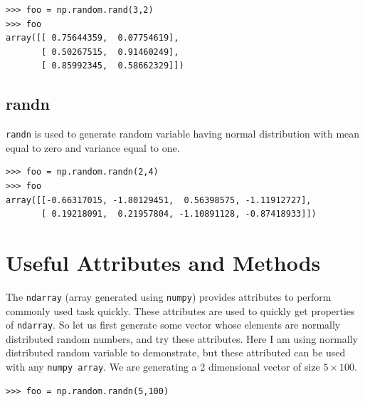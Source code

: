 \documentclass[10pt]{book}
\begin{document}
{\beforeverb \begin{verbatim}
>>> foo = np.random.rand(3,2)
>>> foo
array([[ 0.75644359,  0.07754619],
       [ 0.50267515,  0.91460249],
       [ 0.85992345,  0.58662329]])
\end{verbatim} \afterverb

\subsection{randn}
\verb"randn" is used to generate random variable having normal distribution with mean equal to zero and variance equal to one.

\beforeverb
\begin{verbatim}
>>> foo = np.random.randn(2,4)
>>> foo
array([[-0.66317015, -1.80129451,  0.56398575, -1.11912727],
       [ 0.19218091,  0.21957804, -1.10891128, -0.87418933]])
\end{verbatim}
\afterverb

\section{Useful Attributes and Methods}
The \verb"ndarray" (array generated using \verb"numpy") provides attributes to perform commonly used task quickly. These attributes are used to quickly get  properties of \verb"ndarray". So let us first generate some vector whose elements are normally distributed random numbers, and try these attributes. Here I am using normally distributed random variable to demonstrate, but these attributed can be used with any \verb"numpy array". We are generating a 2 dimensional vector of size $5 \times 100$.
\beforeverb \begin{verbatim}
>>> foo = np.random.randn(5,100)
\end{verbatim} \afterverb

}
\end{document}
